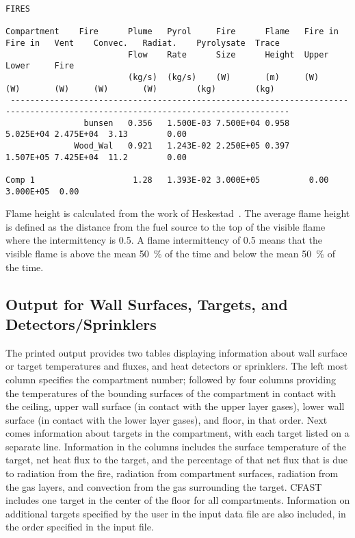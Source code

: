 \begin{lstlisting}[basicstyle=\tiny]
FIRES

Compartment    Fire      Plume   Pyrol     Fire      Flame   Fire in   Fire in   Vent    Convec.   Radiat.    Pyrolysate  Trace
                         Flow    Rate      Size      Height  Upper     Lower     Fire
                         (kg/s)  (kg/s)    (W)       (m)     (W)       (W)       (W)     (W)       (W)        (kg)        (kg)
 -------------------------------------------------------------------------------------------------------------------------------
                bunsen   0.356   1.500E-03 7.500E+04 0.958                               5.025E+04 2.475E+04  3.13        0.00
              Wood_Wal   0.921   1.243E-02 2.250E+05 0.397                               1.507E+05 7.425E+04  11.2        0.00

Comp 1                    1.28   1.393E-02 3.000E+05          0.00     3.000E+05  0.00
\end{lstlisting}
Flame height is calculated from the work of Heskestad~\cite{Heskestad:2002}. The average flame height is defined as the distance from the fuel source to the top of the visible flame where the intermittency is 0.5.  A flame intermittency of 0.5 means that the visible flame is above the mean 50~\% of the time and below the mean 50~\% of the time.


\subsection{Output for Wall Surfaces, Targets, and Detectors/Sprinklers}

The printed output provides two tables displaying information about wall surface or target temperatures and fluxes, and heat detectors or sprinklers. The left most column specifies the compartment number; followed by four columns providing the temperatures of the bounding surfaces of the compartment in contact with the ceiling, upper wall surface (in contact with the upper layer gases), lower wall surface (in contact with the lower layer gases), and floor, in that order. Next comes information about targets in the compartment, with each target listed on a separate line.  Information in the columns includes the surface temperature of the target, net heat flux to the target, and the percentage of that net flux that is due to radiation from the fire, radiation from compartment surfaces, radiation from the gas layers, and convection from the gas surrounding the target.  CFAST includes one target in the center of the floor for all compartments. Information on additional targets specified by the user in the input data file are also included, in the order specified in the input file.

